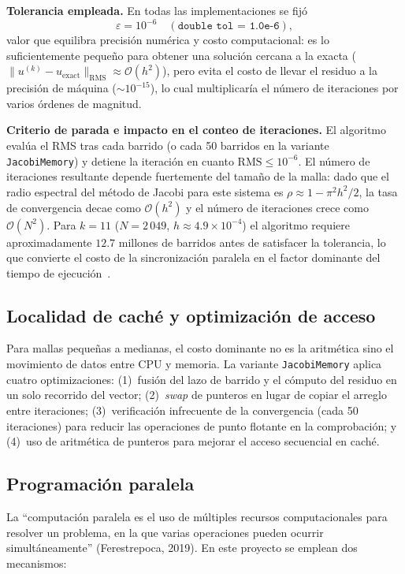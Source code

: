 \documentclass{article}
\begin{document}
\textbf{Tolerancia empleada.}  En todas las implementaciones se fijó
\[
  \varepsilon = 10^{-6} \quad (\texttt{double tol = 1.0e-6}),
\]
valor que equilibra precisión numérica y costo computacional: es lo
suficientemente pequeño para obtener una solución cercana a la exacta
($\|u^{(k)} - u_{\text{exact}}\|_{\text{RMS}} \approx \mathcal{O}(h^2)$), pero
evita el costo de llevar el residuo a la precisión de máquina ($\sim 10^{-15}$),
lo cual multiplicaría el número de iteraciones por varios órdenes de magnitud.

\textbf{Criterio de parada e impacto en el conteo de iteraciones.}  El algoritmo
evalúa el RMS tras cada barrido (o cada 50 barridos en la variante
\texttt{JacobiMemory}) y detiene la iteración en cuanto $\text{RMS} \leq 10^{-6}$.
El número de iteraciones resultante depende fuertemente del tamaño de la malla:
dado que el radio espectral del método de Jacobi para este sistema es
$\rho \approx 1 - \pi^2 h^2 / 2$, la tasa de convergencia decae como
$\mathcal{O}(h^2)$ y el número de iteraciones crece como $\mathcal{O}(N^2)$.
Para $k=11$ ($N=2\,049$, $h \approx 4.9\times10^{-4}$) el algoritmo requiere
aproximadamente $12.7$ millones de barridos antes de satisfacer la tolerancia,
lo que convierte el costo de la sincronización paralela en el factor dominante
del tiempo de ejecución~\cite{burkardt}.

\subsection{Localidad de caché y optimización de acceso}

Para mallas pequeñas a medianas, el costo dominante no es la aritmética sino el
movimiento de datos entre CPU y memoria.  La variante \texttt{JacobiMemory}
aplica cuatro optimizaciones: (1)~fusión del lazo de barrido y el cómputo del
residuo en un solo recorrido del vector; (2)~\emph{swap} de punteros en lugar de
copiar el arreglo entre iteraciones; (3)~verificación infrecuente de la
convergencia (cada 50 iteraciones) para reducir las operaciones de punto flotante
en la comprobación; y (4)~uso de aritmética de punteros para mejorar el acceso
secuencial en caché.

\subsection{Programación paralela}

La ``computación paralela es el uso de múltiples recursos computacionales para
resolver un problema, en la que varias operaciones pueden ocurrir
simultáneamente'' (Ferestrepoca, 2019).  En este proyecto se emplean dos
mecanismos:
\end{document}
